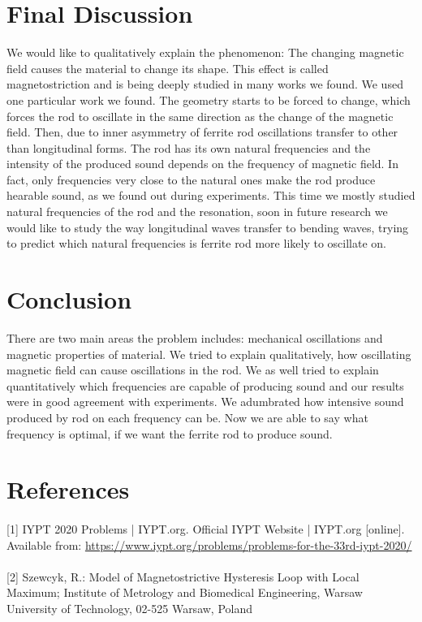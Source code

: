 \documentclass[10pt,a4paper]{article}
\begin{document}
\newpage
\section{Final Discussion}
We would like to qualitatively explain the phenomenon: The changing magnetic field causes the material to change its shape. This effect is called magnetostriction and is being deeply studied in many works we found. We used one particular work we found. The geometry starts to be forced to change, which forces the rod to oscillate in the same direction as the change of the magnetic field. Then, due to inner asymmetry of ferrite rod oscillations transfer to other than longitudinal forms. The rod has its own natural frequencies and the intensity of the produced sound depends on the frequency of magnetic field. In fact, only frequencies very close to the natural ones make the rod produce hearable sound, as we found out during experiments. This time we mostly studied natural frequencies of the rod and the resonation, soon in future research we would like to study the way longitudinal waves transfer to bending waves, trying to predict which natural frequencies is ferrite rod more likely to oscillate on.
\section{Conclusion}
There are two main areas the problem includes: mechanical oscillations and magnetic properties of material. We tried to explain qualitatively, how oscillating magnetic field can cause oscillations in the rod. We as well tried to explain quantitatively which frequencies are capable of producing sound and our results were in good agreement with experiments.  We adumbrated how intensive sound produced by rod on each frequency can be. Now we are able to say what frequency is optimal, if we want the ferrite rod to produce sound.

\section{References}
\paragraph{}[1] IYPT 2020 Problems | IYPT.org. Official IYPT Website | IYPT.org [online]. Available from: \url{https://www.iypt.org/problems/problems-for-the-33rd-iypt-2020/}
\paragraph{}[2] Szewcyk, R.: Model of Magnetostrictive Hysteresis Loop with Local Maximum; Institute of Metrology and Biomedical Engineering, Warsaw University of Technology, 02-525 Warsaw, Poland
\end{document}
